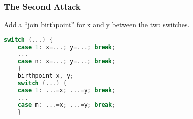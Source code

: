 \subsubsection{The Second Attack }


Add a “join birthpoint”
for x and y between
the two switches. 



\begin{lstlisting}[language=C,frame=single, caption=An ,label = lst:expr2]
    switch (...) {
    case 1: x=...; y=...; break;
    ...
    case n: x=...; y=...; break;
    }
    birthpoint x, y;
    switch (...) {
    case 1: ...=x; ...=y; break;
    ...
    case m: ...=x; ...=y; break;
    }
    \end{lstlisting}